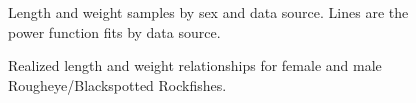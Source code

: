 \documentclass[
]{scrartcl}
\begin{document}
\begin{figure}


\caption{\label{fig-LW1}Length and weight samples by sex and data
source. Lines are the power function fits by data source.}

\end{figure}%

\begin{figure}


\caption{\label{fig-LW2}Realized length and weight relationships for
female and male Rougheye/Blackspotted Rockfishes.}

\end{figure}%
\end{document}
